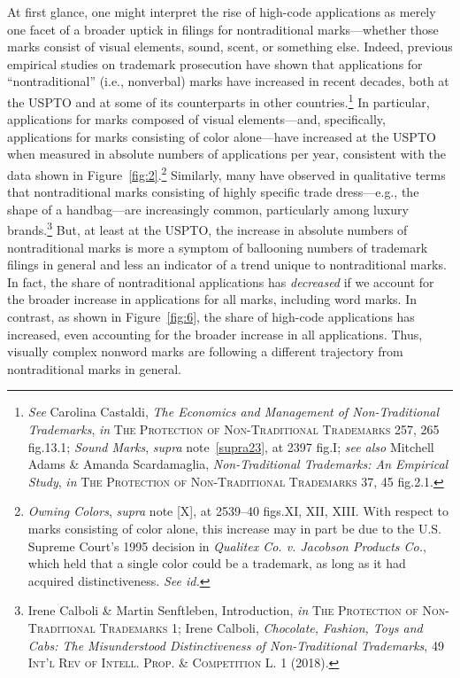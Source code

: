 \documentclass[letterpaper, 11pt, oneside]{article}
\begin{document}
At first glance, one might interpret the rise of high-code applications as merely one facet of a broader uptick in filings for nontraditional marks—whether those marks consist of visual elements, sound, scent, or something else. Indeed, previous empirical studies on trademark prosecution have shown that applications for ``nontraditional'' (i.e., nonverbal) marks have increased in recent decades, both at the USPTO and at some of its counterparts in other countries.\footnote{\textit{See} Carolina Castaldi, \textit{The Economics and Management of Non-Traditional Trademarks}, \textit{in} \textsc{The Protection of Non-Traditional Trademarks} 257, 265 fig.13.1; \textit{Sound Marks}, \textit{supra} note~\ref{supra23}, at 2397 fig.I; \textit{see also} Mitchell Adams \& Amanda Scardamaglia, \textit{Non-Traditional Trademarks: An Empirical Study}, \textit{in} \textsc{The Protection of Non-Traditional Trademarks} 37, 45 fig.2.1.} In particular, applications for marks composed of visual elements—and, specifically, applications for marks consisting of color alone—have increased at the USPTO when measured in absolute numbers of applications per year, consistent with the data shown in Figure~\ref{fig:2}.\footnote{\textit{Owning Colors}, \textit{supra} note [X], at 2539–40 figs.XI, XII, XIII. With respect to marks consisting of color alone, this increase may in part be due to the U.S. Supreme Court's 1995 decision in \textit{Qualitex Co. v. Jacobson Products Co.}, which held that a single color could be a trademark, as long as it had acquired distinctiveness. \textit{See id.}} Similarly, many have observed in qualitative terms that nontraditional marks consisting of highly specific trade dress—e.g., the shape of a handbag—are increasingly common, particularly among luxury brands.\footnote{Irene Calboli \& Martin Senftleben, Introduction, \textit{in} \textsc{The Protection of Non-Traditional Trademarks} 1; Irene Calboli, \textit{Chocolate, Fashion, Toys and Cabs: The Misunderstood Distinctiveness of Non-Traditional Trademarks}, 49 \textsc{Int'l Rev of Intell. Prop. \& Competition L.} 1 (2018).}  But, at least at the USPTO, the increase in absolute numbers of nontraditional marks is more a symptom of ballooning numbers of trademark filings in general and less an indicator of a trend unique to nontraditional marks. In fact, the share of nontraditional applications has \emph{decreased} if we account for the broader increase in applications for all marks, including word marks. In contrast, as shown in Figure~\ref{fig:6}, the share of high-code applications has increased, even accounting for the broader increase in all applications. Thus, visually complex nonword marks are following a different trajectory from nontraditional marks in general.
\end{document}
